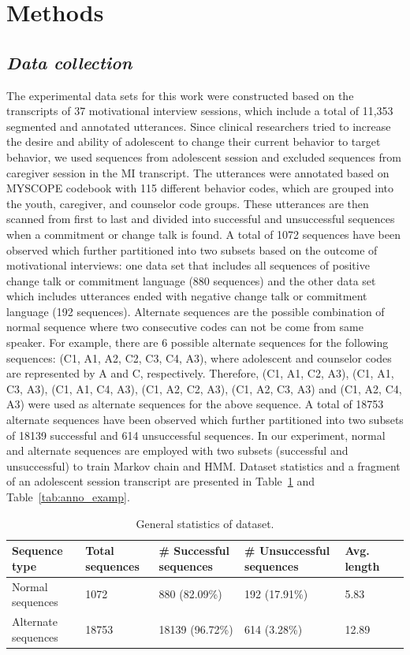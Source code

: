 \documentclass{amia}
\begin{document}
\section*{Methods}
\subsection*{\textit{Data collection}}
The experimental data sets for this work were constructed based on the transcripts of 37 motivational interview sessions, which include a total of 11,353 segmented and annotated utterances. Since clinical researchers tried to increase the desire and ability of adolescent to change their current behavior to target behavior, we used sequences from adolescent session and excluded sequences from caregiver session in the MI transcript. The utterances were annotated based on MYSCOPE codebook \cite{carcone2013provider} with 115 different behavior codes, which are grouped into the youth, caregiver, and counselor code groups. These utterances are then scanned from first to last and divided into successful and unsuccessful sequences when a commitment or change talk is found. A total of 1072 sequences have been observed which further partitioned into two subsets based on the outcome of motivational interviews: one data set that includes all sequences of positive change talk or commitment language (880 sequences) and the other data set which includes utterances ended with negative change talk or commitment language (192 sequences). Alternate sequences are the possible combination of normal sequence where two consecutive codes can not be come from same speaker. For example, there are 6 possible alternate sequences for the following sequences: (C1, A1, A2, C2, C3, C4, A3), where adolescent and counselor codes are represented by A and C, respectively. Therefore, (C1, A1, C2, A3), (C1, A1, C3, A3), (C1, A1, C4, A3), (C1, A2, C2, A3), (C1, A2, C3, A3) and (C1, A2, C4, A3) were used as alternate sequences for the above sequence. A total of 18753 alternate sequences have been observed which further partitioned into two subsets of 18139 successful and 614 unsuccessful sequences. In our experiment, normal and alternate sequences are employed with two subsets (successful and unsuccessful) to train Markov chain and HMM. Dataset statistics and a fragment of an adolescent session transcript are presented in Table~\ref{tab:data_dist} and Table~\ref{tab:anno_examp}. \\

\begin{table}[h]
\centering
\caption{General statistics of dataset.}
\label{tab:data_dist}
  \begin{tabular}{|l|l|l|l|l|l|}
  \hline
   \textbf{Sequence type} & \textbf{Total sequences}  & \textbf{\# Successful sequences}  & \textbf{\# Unsuccessful sequences} & \textbf{Avg. length} \\ \hline      
 Normal sequences & 1072 & 880 (82.09\%) & 192 (17.91\%) & 5.83 \\\hline
Alternate sequences & 18753 & 18139 (96.72\%) & 614 (3.28\%) & 12.89 \\\hline 
  \end{tabular}
\end{table} 
\end{document}
